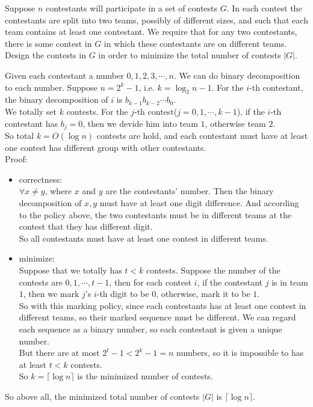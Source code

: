 \problem{}
Suppose $n$ contestants will participate in a set of contests $G$.  In each contest the contestants are split into two teams, possibly of different sizes, and such that each team contains at least one contestant.  We require that for any two contestants, there is some contest in $G$ in which these contestants are on different teams.  Design the contests in $G$ in order to minimize the total number of contests $|G|$.

\solution{}

Given each contestant a number $0,1,2,3,\cdots,n$. We can do binary decomposition to each number.
Suppose $n=2^k-1$, i.e. $k=\log_{2}{n-1}$. For the $i$-th contestant, the binary decomposition of $i$ is $b_{k-1}b_{k-2}\cdots b_0$.\\
We totally set $k$ contests.
For the $j$-th contest($j=0,1,\cdots,k-1$), if the $i$-th contestant has $b_j=0$, then we devide him into team $1$, otherwise team $2$.\\
So total $k=O(\log n)$ contests are hold, and each contestant must have at least one contest has different group with other contestants.\\

Proof:
\begin{itemize}
    \item correctness:\\
    $\forall x\neq y$, where $x$ and $y$ are the contestants' number. Then the binary decomposition of $x,y$ must have at least one digit difference.
    And according to the policy above, the two contestants must be in different teams at the contest that they has different digit.\\
    So all contestants must have at least one contest in different teams.
    \item minimize:\\
    Suppose that we totally has $t<k$ contests. Suppose the number of the contests are $0,1,\cdots, t-1$, then for each contest $i$, if the contestant $j$
    is in team $1$, then we mark $j$'s $i$-th digit to be $0$, otherwise, mark it to be $1$.\\
    So with this marking policy, since each contestants has at least one contest in different teams, so their marked sequence must be different. We can regard each 
    sequence as a binary number, so each contestant is given a unique number.\\
    But there are at most $2^t-1<2^k-1=n$ numbers, so it is impossible to has at least $t<k$ contests.\\
    So $k=\lceil\log n\rceil$ is the minimized number of contests.
\end{itemize}

So above all, the minimized total number of contests $|G|$ is $\lceil\log n\rceil$.\\

\newpage